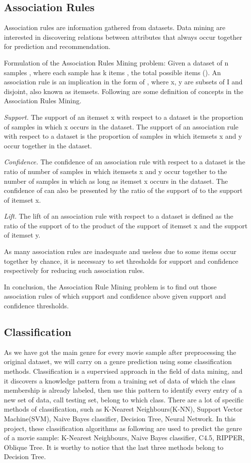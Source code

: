 \documentclass[conference]{IEEEtran}
\begin{document}
\subsection{Association Rules}

Association rules are information gathered from datasets. Data mining are interested in discovering relations between attributes that always occur together for prediction and recommendation. 

Formulation of the Association Rules Mining problem:
Given a dataset of n samples , where each sample has k items , the total possible items ().  An association rule is an implication in the form of , where x, y are subsets of I and disjoint, also known as itemsets. Following are some definition of concepts in the Association Rules Mining.

\textit{Support.} The support of an itemset x with respect to a dataset is the proportion of samples in which x occurs in the dataset. The support of an association rule  with respect to a dataset is the proportion of samples in which itemsets x and y occur together in the dataset. 

\textit{Confidence.} The confidence of an association rule  with respect to a dataset is the ratio of number of samples in which itemsets x and y occur together to the number of samples in which as long as itemset x occurs in the dataset. The confidence of can also be presented by the ratio of the support of  to the support of itemset x.

\textit{Lift.} The lift of an association rule  with respect to a dataset is defined as the ratio 
of  the support of  to the product of the support of itemset x and the support of 
itemset y.

As many association rules are inadequate and useless due to some items occur together by 
chance, it is necessary to set thresholds for support and confidence respectively for reducing such association rules. 

In conclusion, the Association Rule Mining problem is to find out those association rules of which support and confidence above given support and confidence thresholds. 

\subsection{Classification}
As we have got the main genre for every movie sample after preprocessing the original dataset, we will carry on a genre prediction using some classification methods. Classification is a supervised approach in the field of data mining, and it discovers a knowledge pattern from a training set of data of which the class membership is already labeled, then use this pattern to identify every entry of a new set of data, call testing set, belong to which class. There are a lot of specific methods of classification, such as K-Nearest Neighbours(K-NN), Support Vector Machine(SVM), Naive Bayes classifier, Decision Tree, Neural Network.
In this project, these classification algorithms as following are used to predict the genre of a movie sample:  K-Nearest Neighbours, Naive Bayes classifier, C4.5, RIPPER, Oblique Tree. It is worthy to notice that the last three methods belong to Decision Tree. 
\end{document}
